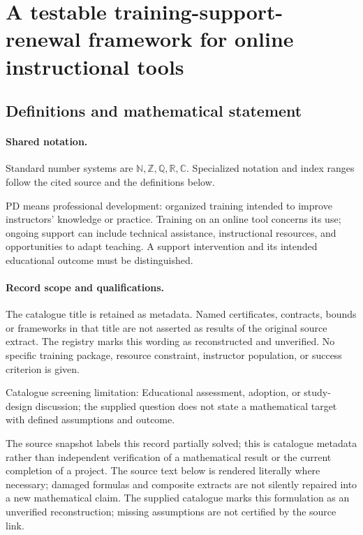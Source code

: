 \documentclass[11pt]{article}
\begin{document}
\section{A testable training-support-renewal framework for online instructional tools}\label{statement}

\subsection{Definitions and mathematical statement}

\paragraph{Shared notation.}Standard number systems are $\mathbb N,\mathbb Z,\mathbb Q,\mathbb R,\mathbb C$. Specialized notation and index ranges follow the cited source and the definitions below.


PD means professional development: organized training intended to improve instructors' knowledge or practice. Training on an online tool concerns its use; ongoing support can include technical assistance, instructional resources, and opportunities to adapt teaching. A support intervention and its intended educational outcome must be distinguished.
\paragraph{Record scope and qualifications.}
The catalogue title is retained as metadata. Named certificates, contracts, bounds or frameworks in that title are not asserted as results of the original source extract.
The registry marks this wording as reconstructed and unverified. No specific training package, resource constraint, instructor population, or success criterion is given.

Catalogue screening limitation: Educational assessment, adoption, or study-design discussion; the supplied question does not state a mathematical target with defined assumptions and outcome.

The source snapshot labels this record partially solved; this is catalogue metadata rather than independent verification of a mathematical result or the current completion of a project.
The source text below is rendered literally where necessary; damaged formulas and composite extracts are not silently repaired into a new mathematical claim.
The supplied catalogue marks this formulation as an unverified reconstruction; missing assumptions are not certified by the source link.
\end{document}
